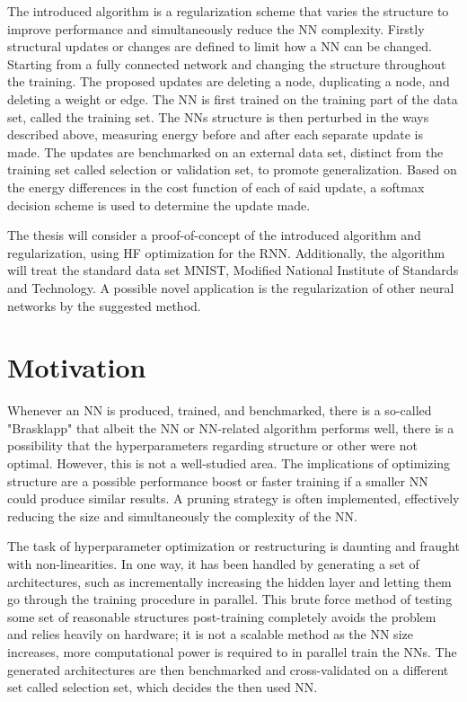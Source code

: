 The introduced algorithm is a regularization scheme that varies the structure to improve performance and simultaneously reduce the NN complexity. Firstly structural updates or changes are defined to limit how a NN can be changed. Starting from a fully connected network and changing the structure throughout the training. The proposed updates are deleting a node, duplicating a node, and deleting a weight or edge. The NN is first trained on the training part of the data set, called the training set. The NNs structure is then perturbed in the ways described above, measuring energy before and after each separate update is made. The updates are benchmarked on an external data set, distinct from the training set called selection or validation set, to promote generalization. Based on the energy differences in the cost function of each of said update, a softmax decision scheme is used to determine the update made. 

The thesis will consider a proof-of-concept of the introduced algorithm and regularization, using HF optimization for the RNN. Additionally, the algorithm will treat the standard data set MNIST, Modified National Institute of Standards and Technology\cite{mnist}. A possible novel application is the regularization of other neural networks by the suggested method.

\section{Motivation}

Whenever an NN is produced, trained, and benchmarked, there is a so-called "Brasklapp" that albeit the NN or NN-related algorithm performs well, there is a possibility that the hyperparameters regarding structure or other were not optimal. However, this is not a well-studied area. The implications of optimizing structure are a possible performance boost or faster training if a smaller NN could produce similar results. A pruning strategy is often implemented, effectively reducing the size and simultaneously the complexity of the NN.  

The task of hyperparameter optimization or restructuring is daunting and fraught with non-linearities. In one way, it has been handled by generating a set of architectures, such as incrementally increasing the hidden layer and letting them go through the training procedure in parallel. This brute force method of testing some set of reasonable structures post-training completely avoids the problem and relies heavily on hardware; it is not a scalable method as the NN size increases, more computational power is required to in parallel train the NNs. The generated architectures are then benchmarked and cross-validated on a different set called selection set, which decides the then used NN. 

